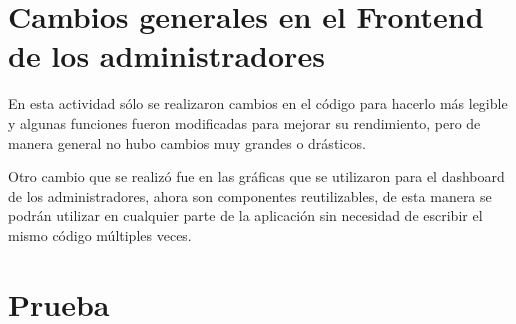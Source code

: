 \section{Cambios generales en el Frontend de los administradores}
En esta actividad sólo se realizaron cambios en el código para hacerlo más legible y algunas funciones fueron modificadas para mejorar su rendimiento, pero de manera general no hubo cambios muy grandes o drásticos. 

Otro cambio que se realizó fue en las gráficas que se utilizaron para el dashboard de los administradores, ahora son componentes reutilizables, de esta manera se podrán utilizar en cualquier parte de la aplicación sin necesidad de escribir el mismo código múltiples veces.

\section{Prueba}